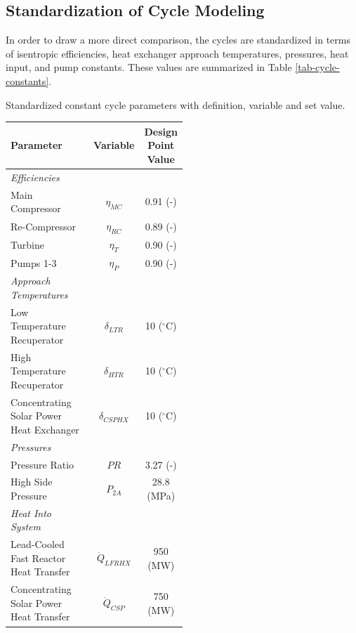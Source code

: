 \begin{paracol}{2}
\subsection{Standardization of Cycle Modeling}

In order to draw a more direct comparison, the cycles are standardized in terms of isentropic efficiencies, heat exchanger approach temperatures, pressures, heat input, and pump constants. These values are summarized in Table \ref{tab-cycle-constants}.

\begin{specialtable}[H] 
    \caption{Standardized constant cycle parameters with definition, variable and set value. \label{tab-cycle-constants}}
    \begin{tabular}{L{0.5\linewidth}cc}
    \toprule
    \textbf{Parameter} & \textbf{Variable}	& \textbf{Design Point Value}\\
    \midrule
    \textit{Efficiencies}\\
    Main Compressor & $\eta_{MC}$		& 0.91 (-)\\
    Re-Compressor & $\eta_{RC}$		& 0.89 (-)\\
    Turbine & $\eta_{T}$		& 0.90 (-)\\
    Pumps 1-3 & $\eta_{P}$      & 0.90 (-)\\
    \midrule
    \textit{Approach Temperatures}\\
    Low Temperature Recuperator & $\delta_{LTR}$		& 10 ($^{\circ}$C)\\
    High Temperature Recuperator & $\delta_{HTR}$		& 10 ($^{\circ}$C)\\
    Concentrating Solar Power Heat Exchanger & $\delta_{CSPHX}$	& 10 ($^{\circ}$C)\\
    \midrule
    \textit{Pressures}\\
    Pressure Ratio & $PR$ & 3.27 (-)\\
    High Side Pressure & $P_{2A}$ & 28.8 (MPa)\\
    \midrule
    \textit{Heat Into System}\\
    Lead-Cooled Fast Reactor Heat Transfer & $\dot{Q}_{LFRHX}$ & 950 (MW)\\
    Concentrating Solar Power Heat Transfer & $\dot{Q}_{CSP}$ & 750 (MW)\\
    \midrule

\end{tabular}
\end{specialtable}
\end{paracol}
